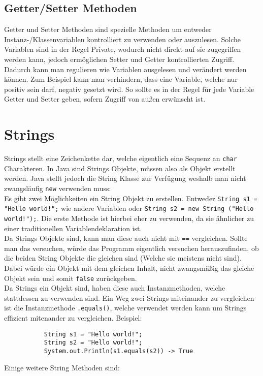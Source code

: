\documentclass{article}
\begin{document}
	\subsection{Getter/Setter Methoden}
	Getter und Setter Methoden sind spezielle Methoden um entweder Instanz-/Klassenvariablen kontrolliert zu verwenden oder auszulesen. Solche Variablen sind in der Regel Private, wodurch nicht direkt auf sie zugegriffen werden kann, jedoch ermöglichen Setter und Getter kontrollierten Zugriff. Dadurch kann man regulieren wie Variablen ausgelesen und verändert werden können.
	Zum Beispiel kann man verhindern, dass eine Variable, welche nur positiv sein darf, negativ gesetzt wird. So sollte es in der Regel für jede Variable Getter und Setter geben, sofern Zugriff von außen erwünscht ist.
	\section{Strings}
	Strings stellt eine Zeichenkette dar, welche eigentlich eine Sequenz an \verb|char| Charakteren. In Java sind Strings Objekte, müssen also als Objekt erstellt werden. Java stellt jedoch die String Klasse zur Verfügung weshalb man nicht zwangsläufig \verb|new| verwenden muss: \\
	Es gibt zwei Möglichkeiten ein String Objekt zu erstellen. Entweder \verb|String s1 = "Hello world!";| wie andere Variablen oder \verb|String s2 = new String ("Hello world!");|. Die erste Methode ist hierbei eher zu verwenden, da sie ähnlicher zu einer traditionellen Variablendeklaration ist. \\
	Da Strings Objekte sind, kann man diese auch nicht mit \verb|==| vergleichen. Sollte man das versuchen, würde das Programm eigentlich versuchen herauszufinden, ob die beiden String Objekte die gleichen sind (Welche sie meistens nicht sind). Dabei würde ein Objekt mit dem gleichen Inhalt, nicht zwangsmäßig das gleiche Objekt sein und somit \verb|false| zurückgeben. \\
	Da Strings ein Objekt sind, haben diese auch Instanzmethoden, welche stattdessen zu verwenden sind. Ein Weg zwei Strings miteinander zu vergleichen ist die Instanzmethode \verb|.equals()|, welche verwendet werden kann um Strings effizient mitenander zu vergleichen. Beispiel:
	\begin{verbatim}
	       String s1 = "Hello world!";
	       String s2 = "Hello world!";
	       System.out.Println(s1.equals(s2)) -> True
	\end{verbatim}
	Einige weitere String Methoden sind:
\end{document}
